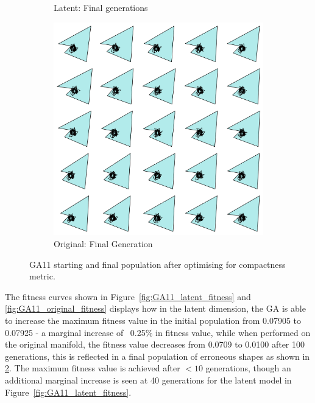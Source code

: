 \documentclass{article}
\begin{document}
\begin{figure}[H]
\begin{subfigure}[b]{0.32\textwidth}
        \caption{Latent: Final generations}
        \label{fig:GA11__latent_final}
    \end{subfigure}
    \hfill
    \begin{subfigure}[b]{0.32\textwidth}
        \centering
        \includegraphics[width=\textwidth]{figures/GAResults/GA11/original/original_final_gen.png}
        \caption{Original: Final Generation}
        \label{fig:GA11_original_final}
    \end{subfigure}
    \caption{GA11 starting and final population after optimising for compactness metric.}
    \label{fig:GA11_before_after_GA}
\end{figure}

The fitness curves  shown in Figure~\ref{fig:GA11_latent_fitness} and \ref{fig:GA11_original_fitness} displays how in the latent dimension, the GA is able to increase the maximum fitness value in the initial population from 0.07905 to 0.07925 - a marginal increase of ~0.25\% in fitness value, while when performed on the original manifold, the fitness value decreases from 0.0709 to 0.0100 after 100 generations, this is reflected in a final population of erroneous shapes as shown in \ref{fig:GA11_original_final}. The maximum fitness value is achieved after $<10$ generations, though an additional marginal increase is seen at 40 generations for the latent model in Figure~\ref{fig:GA11_latent_fitness}.
\end{document}
